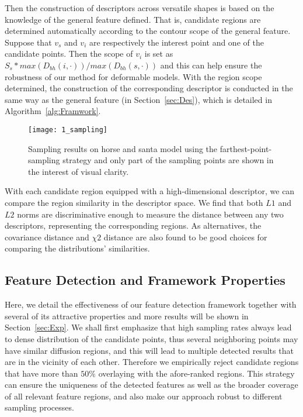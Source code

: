Then the construction of descriptors across versatile shapes is based
on the knowledge of the general feature defined. That is, candidate
regions are determined automatically according to the contour scope of
the general feature. Suppose that $v_{s}$ and $v_{i}$ are respectively
the interest point and one of the candidate points.
Then the scope of $v_{i}$ is set as
$S_{s}*max(D_{bh}(i,\cdot))/max(D_{bh}(s,\cdot))$ and this can help
ensure the robustness of our method for deformable models. With
the region scope determined, the construction of the corresponding
descriptor is conducted in the same way as the general feature (in
Section~\ref{sec:Des}), which is detailed in
Algorithm~\ref{alg:Framwork}.


\begin{figure}[!to]
\begin{center}
\texttt{[image: 1\_sampling]}
\end{center}
\caption{Sampling results on horse and santa model using the
  farthest-point-sampling strategy and only part of the sampling
  points are shown in the interest of visual clarity.}
\label{Sampling}
\end{figure}

With each candidate region equipped with a high-dimensional descriptor,
we can compare the region similarity in the descriptor space. We
find that both $L1$ and $L2$ norms are discriminative enough to measure
the distance between any two descriptors, representing the corresponding
regions. As alternatives, the covariance distance and $\chi{2}$ distance
are also found to be good choices for comparing the distributions'
similarities.

\subsection{Feature Detection and Framework Properties}

Here, we detail the effectiveness of our feature
detection framework together with several of its attractive
properties and more results will be shown in Section~\ref{sec:Exp}.
We shall first emphasize that high sampling rates always lead to dense
distribution of the candidate points, thus several neighboring points
may have similar diffusion regions, and this will lead to multiple
detected results that are in the vicinity of each other. Therefore we
empirically reject candidate regions that have more than $50\%$
overlaying with the afore-ranked regions.  This strategy can ensure
the uniqueness of the detected features as well as the broader
coverage of all relevant feature regions, and also make our approach
robust to different sampling processes.

